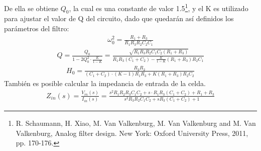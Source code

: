 De ella se obtiene $Q_0$, la cual es una constante de valor 1.5\footnote{R. Schaumann, H. Xiao, M. Van Valkenburg, M. Van Valkenburg and M. Van Valkenburg, Analog filter design. New York: Oxford University Press, 2011, pp. 170-176.}, y el K es utilizado para ajustar el valor de Q del circuito, dado que quedarán así definidos los parámetros del filtro:
\begin{align}
\omega_0^2= \frac{R_1+R_3}{R_1R_3R_2C_2C_1}
\label{eq:omeg}
\end{align}
\begin{align}
Q=\frac{Q_0}{1-2Q_0^2\cdot \frac{K}{1-K}}=\frac{\sqrt[]{R_1R_3R_2C_1C_2(R_1+R_3)}}{R_1R_3(C_1+C_2)-\frac{K}{1-K}(R_1+R_3)R_2C_1}
\label{eq:Q}
\end{align}
\begin{align}
H_0=\frac{R_3R_2}{(C_1+C_2)\cdot (K-1)R_1R_3+K(R_1+R_3)R_2 C_2}
\label{eq:H0}
\end{align}
También es posible calcular la impedancia de entrada de la celda. 
\begin{align}
Z_{in}(s)=\frac{V_{in}(s)}{I_{in}(s)}= \frac{s^2 R_1R_2R_3C_1C_2+s\cdot R_1R_3(C_1+C_2)+R_1+R_3}{s^2R_3R_2C_1C_2+sR_3(C_1+C_2)+1}
\end{align}

